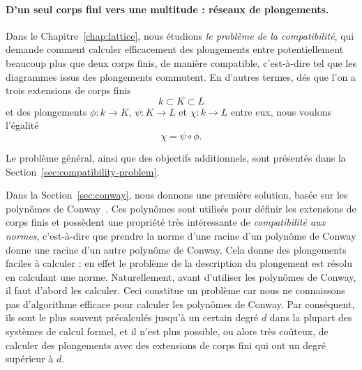 \paragraph{D'un seul corps fini vers une multitude : réseaux de plongements.}
Dans le Chapitre~\ref{chap:lattice}, nous étudions \emph{le problème de la
compatibilité}, qui demande comment calculer efficacement des plongements entre
potentiellement beaucoup plus que deux corps finis, de manière compatible,
c'est-à-dire tel que les diagrammes issus des plongements commutent. En d'autres
termes, dés que l'on a trois extensions de corps finis
\[
  k\subset K\subset L
\]
et des plongements $\phi:k\to K$, $\psi:K\to L$ et $\chi:k\to L$ entre eux, nous
voulons l'égalité
\[
  \chi = \psi\circ\phi.
\]
\begin{center}
\end{center}
Le problème général, ainsi que des objectifs additionnels, sont présentés dans
la Section~\ref{sec:compatibility-problem}.

Dans la Section~\ref{sec:conway}, nous donnons une première solution, basée sur
les polynômes de Conway~\cite{Parker90, Scheerhorn92}. Ces polynômes sont
utilisés pour définir les extensions de corps finis et possèdent une propriété
très intéressante de \emph{compatibilité aux normes}, c'est-à-dire que prendre
la norme d'une racine d'un polynôme de Conway donne une racine d'un autre
polynôme de Conway. Cela donne des plongements faciles à calculer : en effet le
problème de la description du plongement est résolu en calculant une norme.
Naturellement, avant d'utiliser les polynômes de Conway, il faut d'abord les
calculer. Ceci constitue un problème car nous ne connaissons pas d'algorithme
efficace pour calculer les polynômes de Conway. Par conséquent, ils sont le plus
souvent précalculés jusqu'à un certain degré $d$ dans la plupart des systèmes de
calcul formel, et il n'est plus possible, ou alors très coûteux, de calculer des
plongements avec des extensions de corps fini qui ont un degré supérieur à $d$.

